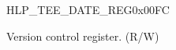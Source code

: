 \begin{register}{H}{LP\_TEE\_DATE\_REG}{0x00FC}\label{regdesc:LPTEEDATEREG}
%
%
\regnewline%
\begin{regdesc}\begin{reglist}
\label{fielddesc:LPTEEDATE}\item [LP\_TEE\_DATE] Version control register. (R/W)
\end{reglist}\end{regdesc}
\end{register}


